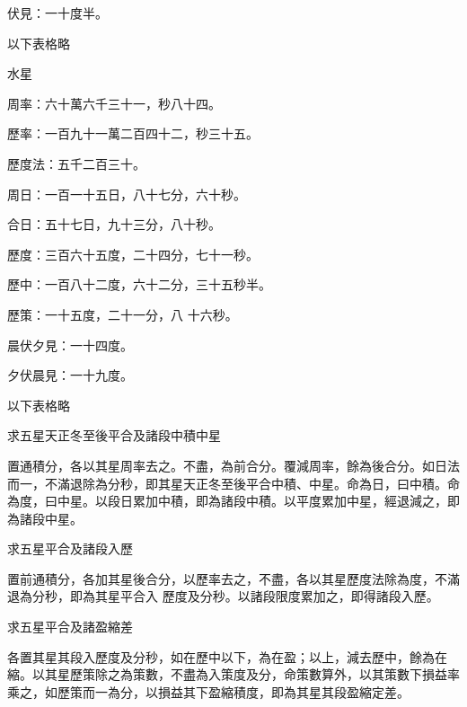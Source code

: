 \begin{pinyinscope}
 伏見：一十度半。



 以下表格略



 水星



 周率：六十萬六千三十一，秒八十四。



 歷率：一百九十一萬二百四十二，秒三十五。



 歷度法：五千二百三十。



 周日：一百一十五日，八十七分，六十秒。



 合日：五十七日，九十三分，八十秒。



 歷度：三百六十五度，二十四分，七十一秒。



 歷中：一百八十二度，六十二分，三十五秒半。



 歷策：一十五度，二十一分，八
 十六秒。



 晨伏夕見：一十四度。



 夕伏晨見：一十九度。



 以下表格略



 求五星天正冬至後平合及諸段中積中星



 置通積分，各以其星周率去之。不盡，為前合分。覆減周率，餘為後合分。如日法而一，不滿退除為分秒，即其星天正冬至後平合中積、中星。命為日，曰中積。命為度，曰中星。以段日累加中積，即為諸段中積。以平度累加中星，經退減之，即為諸段中星。



 求五星平合及諸段入歷



 置前通積分，各加其星後合分，以歷率去之，不盡，各以其星歷度法除為度，不滿退為分秒，即為其星平合入
 歷度及分秒。以諸段限度累加之，即得諸段入歷。



 求五星平合及諸盈縮差



 各置其星其段入歷度及分秒，如在歷中以下，為在盈；以上，減去歷中，餘為在縮。以其星歷策除之為策數，不盡為入策度及分，命策數算外，以其策數下損益率乘之，如歷策而一為分，以損益其下盈縮積度，即為其星其段盈縮定差。




\end{pinyinscope}
